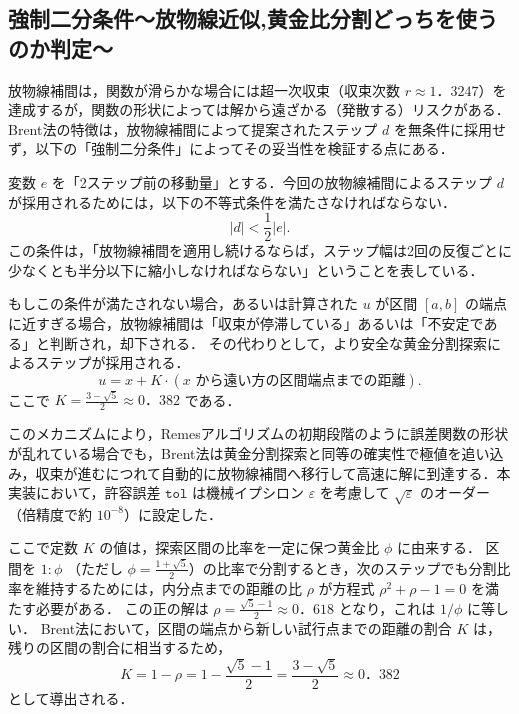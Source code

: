   \label{subsec:bisection_condition}
  \subsection{強制二分条件～放物線近似,黄金比分割どっちを使うのか判定～}
    放物線補間は，関数が滑らかな場合には超一次収束（収束次数 $r \approx 1．3247$）を達成するが，関数の形状によっては解から遠ざかる（発散する）リスクがある．
    Brent法の特徴は，放物線補間によって提案されたステップ $d$ を無条件に採用せず，以下の「強制二分条件」によってその妥当性を検証する点にある．

    変数 $e$ を「2ステップ前の移動量」とする．今回の放物線補間によるステップ $d$ が採用されるためには，以下の不等式条件を満たさなければならない．
    \begin{equation}
      |d| < \frac{1}{2} |e|.
    \end{equation}
    この条件は，「放物線補間を適用し続けるならば，ステップ幅は2回の反復ごとに少なくとも半分以下に縮小しなければならない」ということを表している．
    
    もしこの条件が満たされない場合，あるいは計算された $u$ が区間 $[a, b]$ の端点に近すぎる場合，放物線補間は「収束が停滞している」あるいは「不安定である」と判断され，却下される．
    その代わりとして，より安全な黄金分割探索によるステップが採用される．
    \begin{equation}
      u = x + K \cdot (x \text{ から遠い方の区間端点までの距離}).
    \end{equation}
    ここで $K = \frac{3-\sqrt{5}}{2} \approx 0．382$ である．
    
    このメカニズムにより，Remesアルゴリズムの初期段階のように誤差関数の形状が乱れている場合でも，Brent法は黄金分割探索と同等の確実性で極値を追い込み，収束が進むにつれて自動的に放物線補間へ移行して高速に解に到達する．本実装において，許容誤差 $\texttt{tol}$ は機械イプシロン $\varepsilon$ を考慮して $\sqrt{\varepsilon}$ のオーダー（倍精度で約 $10^{-8}$）に設定した．

    ここで定数 $K$ の値は，探索区間の比率を一定に保つ黄金比 $\phi$ に由来する．
    区間を $1 : \phi$ （ただし $\phi = \frac{1+\sqrt{5}}{2}$）の比率で分割するとき，次のステップでも分割比率を維持するためには，内分点までの距離の比 $\rho$ が方程式 $\rho^2 + \rho - 1 = 0$ を満たす必要がある．
    この正の解は $\rho = \frac{\sqrt{5}-1}{2} \approx 0．618$ となり，これは $1/\phi$ に等しい．
    Brent法において，区間の端点から新しい試行点までの距離の割合 $K$ は，残りの区間の割合に相当するため，
    \begin{equation}
      K = 1 - \rho = 1 - \frac{\sqrt{5}-1}{2} = \frac{3-\sqrt{5}}{2} \approx 0．382
    \end{equation}
    として導出される\cite{brent-original}．

  \newpage  %
  

\newpage  %